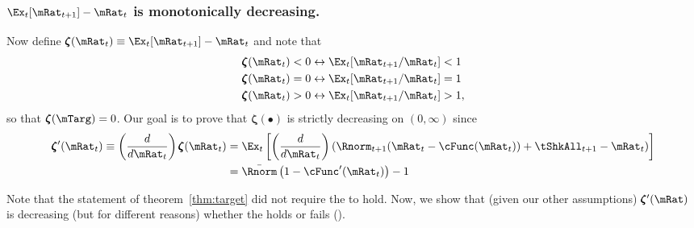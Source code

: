 \documentclass[BufferStockTheory]{subfiles}
\begin{document}
\subsubsection{$\Ex_t [{\mRat}_{t+1}] -\mRat_t$ is monotonically decreasing.}

Now define \providecommand{\difFunc}{\pmb{\zeta}} $\difFunc(\mRat_t) \equiv 
\Ex_t[\mRat_{t+1}] - \mRat_t$ and note that
\begin{equation}\begin{gathered}\begin{aligned}\label{eq:difRatioEquiv}
  \difFunc(\mRat_t) < 0 &\leftrightarrow \Ex_t[{\mRat}_{t+1}/\mRat_t] < 1 
                          \nonumber\\
  \difFunc(\mRat_t) = 0 &\leftrightarrow \Ex_t[{\mRat}_{t+1}/\mRat_t] = 1\\
  \difFunc(\mRat_t) > 0 &\leftrightarrow \Ex_t[{\mRat}_{t+1}/\mRat_t] > 
                          1,\nonumber
\end{aligned}\end{gathered}\end{equation}
so that $\difFunc(\mTarg)=0$. Our goal is to prove that $\difFunc(\bullet)$ is strictly 
decreasing on $(0,\infty)$ since
\begin{equation}\begin{gathered}\begin{aligned}
  \difFunc^{\prime}(\mRat_{t}) \equiv  \left( \frac{d}{d\mRat_{t}}\right) \difFunc(\mRat_t)  & = \Ex_{t}\left[
                                                                                               \left( \frac{d}{d\mRat_{t}}\right) \left( 
                                                                                               {\Rnorm}_{t+1}(\mRat_{t}-\cFunc(\mRat_{t}))+%
                                                                                               {\tShkAll}_{t+1} - {\mRat}_t\right) \right] \label{eq:difFuncDecreases} \\
                                                                                             & = \bar{\Rnorm}\left(1-\cFunc^{\prime}({\mRat}_t)\right) - 1  \notag
\end{aligned}\end{gathered}\end{equation}

Note that the statement of theorem~\ref{thm:target} did not require the {\RIC} to hold.  Now, we show that (given our other assumptions) $\difFunc^{\prime}(\mRat)$ is decreasing (but for different reasons) whether the {\RIC} holds or fails (\cncl{\RIC}).
\end{document}
